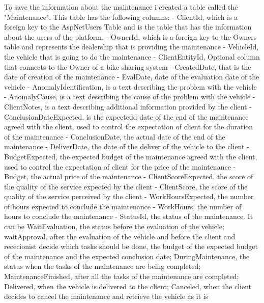 To save the information about the maintenance i created a table called the "Maintenance". This table has the following columns:
- ClientId, which is a foreign key to the AspNetUsers Table and is the table that has the information about the users of the platform.
- OwnerId, which is a foreign key to the Owners table and represents the dealership that is providing the maintenance
- VehicleId, the vehicle that is going to do the maintenance
- ClientEntityId, Optional column that connects to the Owner of a bike sharing system
- CreatedDate, that is the date of creation of the maintenance
- EvalDate, date of the evaluation date of the vehicle
- AnomalyIdentification, is a text describing the problem with the vehicle
- AnomalyCause, is a text describing the cause of the problem with the vehicle
- ClientNotes, is a text describing additional information provided by the client
- ConclusionDateExpected, is the expectedd date of the end of the maintenance agreed with the client, used to control the expectation of client for the duration of the maintenance 
- ConclusionDate, the actual date of the end of the maintenance
- DeliverDate, the date of the deliver of the vehicle to the client
- BudgetExpected, the expected budget of the maintenance agreed with the client, used to control the expectation of client for the price of the maintenance 
- Budget, the actual price of the maintenance
- ClientScoreExpected, the score of the quality of the service expected by the client
- ClientScore, the score of the quality of the service perceived by the client
- WorkHoursExpected, the number of hours expected to conclude the maintenance
- WorkHours, the number of hours to conclude the maintenance
- StatusId, the status of the maintenance. It can be WaitEvaluation, the status before the evaluation of the vehicle; waitApproval, after the evaluation of the vehicle and before the client and rececionist decide which tasks should be done, the budget of the expected budget of the maintenance and the expected conclusion date; DuringMaintenance, the status when the tasks of the maintenance are being completed; MaintenanceFinished, after all the tasks of the maintenance are completed; Delivered, when the vehicle is delivered to the client; Canceled, when the client decides to cancel the maintenance and retrieve the vehicle as it is

